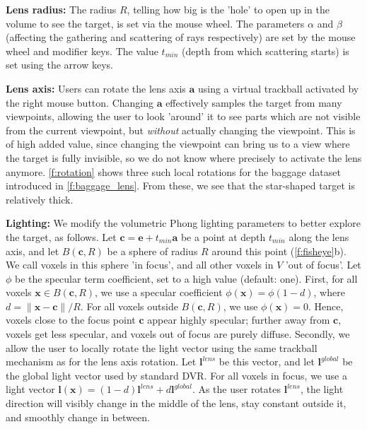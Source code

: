 \noindent\textbf{Lens radius:} The radius $R$, telling how big is the 'hole' to open up in the volume to see the target, is set via the mouse wheel. The parameters $\alpha$ and $\beta$ (affecting the gathering and scattering of rays respectively) are set by the mouse wheel and modifier keys. The value $t_{min}$ (depth from which scattering starts) is set using the arrow keys.

\noindent\textbf{Lens axis:} Users can rotate the lens axis $\mathbf{a}$ using a virtual trackball activated by the right mouse button. Changing $\mathbf{a}$ effectively samples the target from many viewpoints, allowing the user to look 'around' it to see parts which are not visible from the current viewpoint, but \emph{without} actually changing the viewpoint. This is of high added value, since changing the viewpoint can bring us to a view where the target is fully invisible, so we do not know where precisely to activate the lens anymore. \autoref{f:rotation} shows three such local rotations for the baggage dataset introduced in  \autoref{f:baggage_lens}. From these, we see that the star-shaped target is relatively thick.


\noindent\textbf{Lighting:} We modify the volumetric Phong lighting parameters to better explore the target, as follows. Let $\mathbf{c} = \mathbf{e} + t_{min}\mathbf{a}$ be a point at depth $t_{min}$ along the lens axis, and let $B(\mathbf{c},R)$ be a sphere of radius $R$ around this point (\autoref{f:fisheye}b). We call voxels in this sphere 'in focus', and all other voxels in $V$ 'out of focus'. Let $\phi$ be the specular term coefficient, set to a high value (default: one).
First, for all voxels $\mathbf{x} \in B(\mathbf{c},R)$, we use a specular coefficient $\phi(\mathbf{x}) = \phi (1-d)$, where $d=\|\mathbf{x}-\mathbf{c}\|/R$. For all voxels outside $B(\mathbf{c},R)$, we use $\phi(\mathbf{x}) = 0$. Hence, voxels close to the focus point $\mathbf{c}$ appear highly specular; further away from $\mathbf{c}$, voxels get less specular, and voxels out of focus are purely diffuse. Secondly, we allow the user to locally rotate the light vector using the same trackball mechanism as for the lens axis rotation. Let $\mathbf{l}^{lens}$ be this vector, and let $\mathbf{l}^{global}$ be the global light vector used by standard DVR. For all voxels in focus, we use a light vector $\mathbf{l}(\mathbf{x}) = (1 - d)\mathbf{l}^{lens} + d\mathbf{l}^{global}$. As the user rotates $\mathbf{l}^{lens}$, the light direction will visibly change in the middle of the lens, stay constant outside it, and smoothly change in between.


